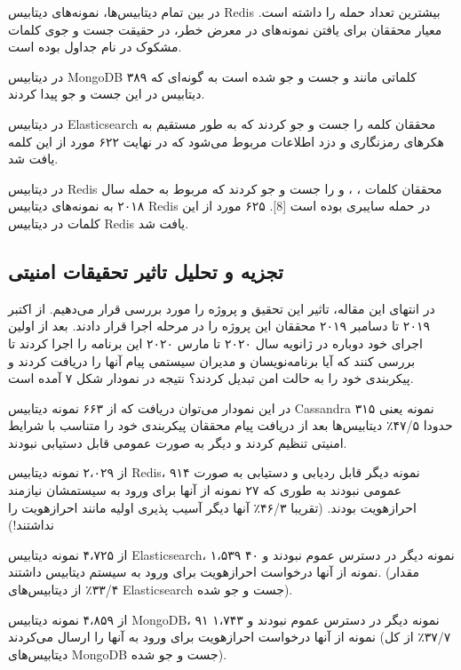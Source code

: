 \documentclass[10pt, a4paper]{article}
\begin{document}
در بین تمام دیتابیس‌ها، نمونه‌های دیتابیس Redis بیشترین تعداد حمله را داشته است.
معیار محققان برای یافتن نمونه‌های در معرض خطر، در حقیقت جست و جوی کلمات مشکوک در
نام جداول بوده است.

در دیتابیس MongoDB کلماتی مانند  و  جست و جو شده است به گونه‌ای که ۳۸۹ دیتابیس در این جست و جو پیدا کردند.

در دیتابیس Elasticsearch محققان کلمه  را جست و جو کردند که به طور
مستقیم به هکر‌های رمزنگاری و دزد اطلاعات مربوط می‌شود که در نهایت ۶۲۲ مورد از
این کلمه یافت شد.

در دیتابیس Redis محققان کلمات ، ،  و
 را جست و جو کردند که مربوط به حمله سال ۲۰۱۸ به نمونه‌های دیتابیس
Redis در حمله سایبری بوده است [8]. ۶۲۵ مورد از این کلمات در دیتابیس Redis یافت
شد.

\newpage

\subsection{تجزیه و تحلیل تاثیر تحقیقات امنیتی}

در انتهای این مقاله، تاثیر این تحقیق و پروژه را مورد بررسی قرار می‌دهیم. از
اکتبر ۲۰۱۹ تا دسامبر ۲۰۱۹ محققان این پروژه را در مرحله اجرا قرار دادند. بعد از
اولین اجرای خود دوباره در ژانویه سال ۲۰۲۰ تا مارس ۲۰۲۰ این برنامه را اجرا کردند
تا بررسی کنند که آیا برنامه‌نویسان و مدیران سیستمی پیام آنها را دریافت کردند و
پیکربندی خود را به حالت امن تبدیل کردند؟ نتیجه در نمودار شکل ۷ آمده است.

در این نمودار می‌توان دریافت که از ۶۶۳ نمونه دیتابیس Cassandra ۳۱۵ نمونه یعنی
حدودا ۴۷/۵٪ دیتابیس‌ها بعد از دریافت پیام محققان پیکربندی خود را متناسب با شرایط
امنیتی تنظیم کردند و دیگر به صورت عمومی قابل دستیابی نبودند.

از ۲،۰۲۹ نمونه دیتابیس Redis، ۹۱۴ نمونه دیگر قابل ردیابی و دستیابی به صورت عمومی
نبودند به طوری که ۲۷ نمونه از آنها برای ورود به سیستمشان نیازمند احرازهویت
بودند. (تقریبا ۴۶/۳٪ آنها دیگر آسیب پذیری اولیه مانند احرازهویت را نداشتند!)

از ۴،۷۲۵ نمونه دیتابیس Elasticsearch، ۱،۵۳۹ نمونه دیگر در دسترس عموم نبودند و ۴۰
نمونه از آنها درخواست احرازهویت برای ورود به سیستم دیتابیس داشتند. (مقدار ۳۳/۴٪
از دیتابیس‌های Elasticsearch جست و جو شده).

از ۴،۸۵۹ نمونه دیتابیس MongoDB، ۹۱ نمونه دیگر در دسترس عموم نبودند و ۱،۷۴۳ نمونه
از آنها درخواست احرازهویت برای ورود به آنها را ارسال می‌کردند (۳۷/۷٪ از کل
دیتابیس‌های MongoDB جست و جو شده).
\end{document}
